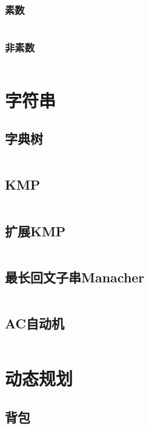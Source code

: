 \documentclass[twoside,sub3section,UTF8]{ctexart}						%
\begin{document}
		\subsubsection{素数}
		\inputminted{c++}{"Maths/CRT(prime).cpp"}
		\subsubsection{非素数}
		\inputminted{c++}{"Maths/CRT(notprime).cpp"}
 
\section{字符串}
	\subsection{字典树}
	\inputminted{c++}{"String/Trie.cpp"}
	\subsection{KMP}
	\inputminted{c++}{"String/KMP.cpp"}
	\subsection{扩展KMP}
	\inputminted{c++}{"String/EXKMP.cpp"}
	\subsection{最长回文子串Manacher}
	\inputminted{c++}{"String/Manacher.cpp"}
	\subsection{AC自动机}
	\inputminted{c++}{"String/AC.cpp"}
	
\section{动态规划}
	\subsection{背包}
	\inputminted{c++}{"Dynamic Programme/bag.cpp"}
\end{document}
